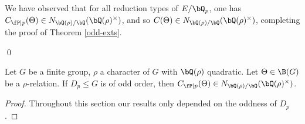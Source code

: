 We have observed that for all reduction types of $E / \bQ_p$, one has $C_{\fP \mid p} (\Theta) \in \fieldnorm{\rho}$, and so $C(\Theta) \in \fieldnorm{\rho}$, completing the proof of Theorem \ref{odd-exts}.

\qed

\begin{cor}\label{cor-odd-decomp}
    Let $G$ be a finite group, $\rho$ a character of $G$ with $\bQ(\rho)$ quadratic. Let $\Theta \in \B(G)$ be a $\rho$-relation. If $D_p \leq G$ is of odd order, then $C_{\fP \mid p}(\Theta) \in \fieldnorm{\rho}$.
\end{cor}

\begin{proof}
 Throughout this section our results only depended on the oddness of $D_p$.
\end{proof}
